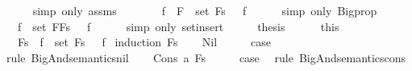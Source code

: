 \begin{isabellebody}
\ \ \ \ \isamarkupfalse%
\ {\isacharparenleft}simp\ only{\isacharcolon}\ assms{\isacharparenright}\isanewline
\ \ \isamarkupfalse%
\ \isamarkupfalse%
\ {\isachardoublequoteopen}{\isasymdots}\ {\isacharequal}\ {\isacharparenleft}{\isasymforall}f\ {\isasymin}\ {\isacharparenleft}{\isacharbraceleft}F{\isacharbraceright}\ {\isasymunion}\ set\ Fs{\isacharparenright}{\isachardot}\ {\isasymA}\ {\isasymTurnstile}\ f{\isacharparenright}{\isachardoublequoteclose}\isanewline
\ \ \ \ \isamarkupfalse%
\ {\isacharparenleft}simp\ only{\isacharcolon}\ Bigprop{}{\isacharparenright}\isanewline
\ \ \isamarkupfalse%
\ \isamarkupfalse%
\ {\isachardoublequoteopen}{\isasymdots}\ {\isacharequal}\ {\isacharparenleft}{\isasymforall}f\ {\isasymin}\ set\ {\isacharparenleft}F{\isacharhash}Fs{\isacharparenright}{\isachardot}\ {\isasymA}\ {\isasymTurnstile}\ f{\isacharparenright}{\isachardoublequoteclose}\isanewline
\ \ \ \ \isamarkupfalse%
\ {\isacharparenleft}simp\ only{\isacharcolon}\ set{\isacharunderscore}insert{\isacharparenright}\isanewline
\ \ \isamarkupfalse%
\ \isamarkupfalse%
\ {\isacharquery}thesis\isanewline
\ \ \ \ \isamarkupfalse%
\ this\isanewline
{}\isamarkupfalse%
%
\endisatagproof
{\isafoldproof}%
%
\isadelimproof
\isanewline
%
\endisadelimproof
\isanewline
{}\isamarkupfalse%
\ {\isachardoublequoteopen}{\isacharparenleft}{\isasymA}\ {\isasymTurnstile}\ \isactrlbold {\isasymAnd}Fs{\isacharparenright}\ {\isasymlongleftrightarrow}\ {\isacharparenleft}{\isasymforall}f\ {\isasymin}\ set\ Fs{\isachardot}\ {\isasymA}\ {\isasymTurnstile}\ f{\isacharparenright}{\isachardoublequoteclose}\isanewline
%
\isadelimproof
%
\endisadelimproof
%
\isatagproof
{}\isamarkupfalse%
\ {\isacharparenleft}induction\ Fs{\isacharparenright}\isanewline
\ \ \isamarkupfalse%
\ Nil\isanewline
\ \ \isamarkupfalse%
\ \isamarkupfalse%
\ {\isacharquery}case\ \isamarkupfalse%
\ {\isacharparenleft}rule\ BigAnd{\isacharunderscore}semantics{\isacharunderscore}nil{\isacharparenright}\isanewline
{}\isamarkupfalse%
\isanewline
\ \ \isamarkupfalse%
\ {\isacharparenleft}Cons\ a\ Fs{\isacharparenright}\isanewline
\ \ \isamarkupfalse%
\ \isamarkupfalse%
\ {\isacharquery}case\ \isamarkupfalse%
\ {\isacharparenleft}rule\ BigAnd{\isacharunderscore}semantics{\isacharunderscore}cons{\isacharparenright}\isanewline

\end{isabellebody}
